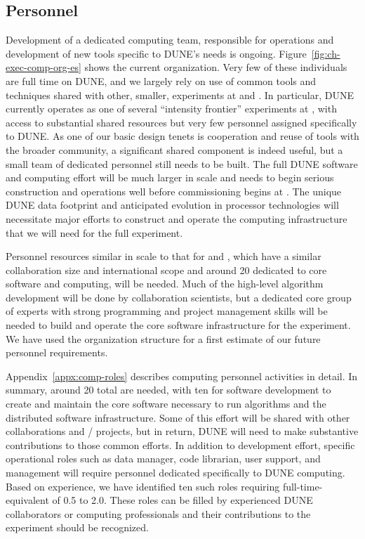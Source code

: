 \subsection{Personnel}


Development of a  dedicated  computing team, responsible for operations and development of new tools specific to DUNE's needs is ongoing. 
Figure~\ref{fig:ch-exec-comp-org-es} shows the current organization.  Very few of these individuals are full time on DUNE, and we largely rely on use of common tools and techniques shared with other, smaller, experiments at  and . In particular, DUNE currently operates as one of several ``intensity frontier'' experiments at , with access to substantial shared resources but very few personnel assigned specifically to DUNE.  As one of our basic design tenets is cooperation and reuse of tools with the broader community, a significant shared component is indeed useful, but a small team of dedicated personnel still needs to be built. 
The full DUNE software and computing effort will be much larger in scale and needs to begin serious construction and operations well before commissioning begins at . The unique DUNE data footprint and anticipated evolution in processor technologies will necessitate major efforts to construct and operate the computing infrastructure that we will need for the full experiment.

Personnel resources similar in scale to that for  and , which have a similar collaboration size and international scope and around 20  dedicated to core software and computing, will be needed.  
Much of the high-level algorithm development will be done by collaboration scientists, but a dedicated core group of experts with strong programming and project management skills will be needed to build and operate the core software infrastructure for the experiment.  We have used the  organization structure for a first estimate of our future personnel requirements.


Appendix~\ref{appx:comp-roles} describes computing personnel activities in detail.  In summary, around 20 total   are needed, with  ten  for software development to create and maintain the core software necessary to run  algorithms and the distributed software infrastructure.  Some of this effort will be shared with other collaborations and / projects, but in return, DUNE will need to make substantive contributions to those common efforts. In addition to development effort,%
specific operational roles such as data manager, code librarian, user support, and management %
will require personnel dedicated specifically to DUNE computing. Based on  experience, we have identified ten such roles 
requiring full-time-equivalent  of 0.5 to 2.0.  These roles can be filled by experienced DUNE collaborators or computing professionals and their contributions to the experiment should be  recognized. 



